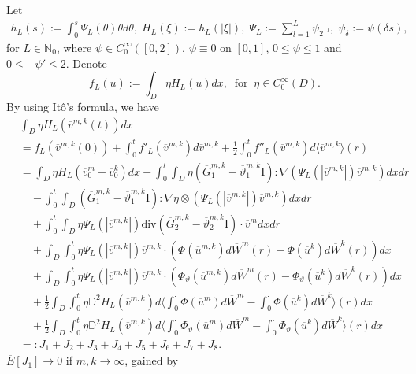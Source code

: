 \documentclass[reqno]{amsart}
\theoremstyle{definition}
\theoremstyle{remark}
\numberwithin{equation}{section} \allowdisplaybreaks
\begin{document}
Let
\begin{align*}h_L(s):=\int_0^s\Psi_L(\theta)\theta d\theta,\;
H_L(\xi):=h_L(|\xi|),\; \Psi_L:=\sum_{l=1}^L\psi_{2^{-l}},\;
\psi_{\delta}:=\psi(\delta s),
\end{align*}
for $L\in\mathbb{N}_0$, where $\psi\in C_0^\infty([0,2])$,
$\psi\equiv0$ on $[0,1]$, $0\leq\psi\leq1$ and $0\leq-\psi'\leq2$.
Denote
$$f_L(u):=\int_D\eta H_L(u)dx,~\mbox{ for }~\eta\in C_0^\infty(D).$$
By using It\^{o}'s formula, we have
\begin{align*}
&\int_{D}\eta H_L(\overline{v}^{m,k}(t))dx\\
&=f_L(\overline{v}^{m,k}(0))+\int_0^tf'_L(\overline{v}^{m,k})d\overline{v}^{m,k}+\frac{1}{2}\int_0^tf''_L(\overline{v}^{m,k})d\langle\overline{v}^{m,k}\rangle(r)\\
&=\int_{D}\eta
H_L(\overline{v}^{m}_0-\overline{v}^{k}_0)dx-\int_0^t\!\!\!\int_{D}\eta(\overline{G}_1^{m,k}-\overline{\vartheta}_1^{m,k}\textrm{I}):\nabla(\Psi_L(|\overline{v}^{m,k}|)
\overline{v}^{m,k})dxdr\\
&\quad-\int_0^t\!\!\!\int_{D}(\overline{G}_1^{m,k}-\overline{\vartheta}_1^{m,k}\textrm{I}):\nabla\eta\otimes(\Psi_L(|\overline{v}^{m,k}|)\overline{v}^{m,k})dxdr\\
&\quad+\int_0^t\!\!\!\int_{D}\eta\Psi_L(|\overline{v}^{m,k}|)\text{div}\left(\overline{G}_2^{m,k}-\overline{\vartheta}_2^{m,k}\textrm{I}\right)\cdot\overline{v}^mdxdr\\
&\quad+\int_{D}\!\!\int_0^t\eta\Psi_L(|\overline{v}^{m,k}|)\overline{v}^{m,k}\cdot \left(\Phi(\overline{u}^{m,k})d\overline{W}^m(r)-\Phi(\overline{u}^{k})d\overline{W}^k(r)\right)dx\\
&\quad+\int_{D}\!\!\int_0^t\eta\Psi_L(|\overline{v}^{m,k}|)\overline{v}^{m,k}\cdot
\left(\Phi_\vartheta(\overline{u}^{m,k})d\overline{W}^m(r)-\Phi_\vartheta(\overline{u}^{k})
d\overline{W}^k(r)\right)dx\\
&\quad+\frac{1}{2}\int_{D}\!\!\int_0^t\eta \mathbb{D}^2H_L(\overline{v}^{m,k})d\langle\int_0^\cdot\Phi(\overline{u}^m)d\overline{W}^m-\int_0^\cdot\Phi(\overline{u}^k)d\overline{W}^k\rangle(r) dx\\
&\quad+\frac{1}{2}\int_{D}\!\!\int_0^t\eta
\mathbb{D}^2H_L(\overline{v}^{m,k})d\langle\int_0^\cdot\Phi_\vartheta(\overline{u}^m)d\overline{W}^m-
\int_0^\cdot\Phi_\vartheta(\overline{u}^k)d\overline{W}^k\rangle(r) dx\\
&=:J_1+J_2+J_3+J_4+J_5+J_6+J_7+J_8.
\end{align*}
$\overline{E}[J_1]\rightarrow0$ if $m,k\rightarrow\infty$, gained by
\end{document}
